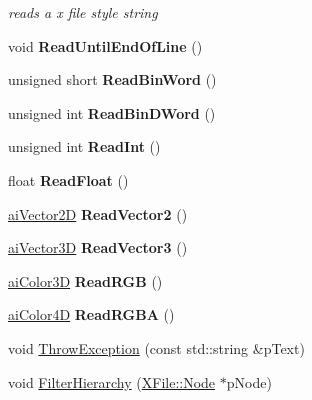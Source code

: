 \begin{DoxyCompactItemize}
\begin{DoxyCompactList}\small\item\em reads a x file style string \end{DoxyCompactList}\item 
\hypertarget{class_assimp_1_1_x_file_parser_aa302b7d6cc5661ee6f9cef70ff01addd}{void {\bfseries Read\+Until\+End\+Of\+Line} ()}\label{class_assimp_1_1_x_file_parser_aa302b7d6cc5661ee6f9cef70ff01addd}

\item 
\hypertarget{class_assimp_1_1_x_file_parser_acdc08c5da9c41871497970ebe6364b52}{unsigned short {\bfseries Read\+Bin\+Word} ()}\label{class_assimp_1_1_x_file_parser_acdc08c5da9c41871497970ebe6364b52}

\item 
\hypertarget{class_assimp_1_1_x_file_parser_a8dffd7bf0a4604d5918030a1547cbdac}{unsigned int {\bfseries Read\+Bin\+D\+Word} ()}\label{class_assimp_1_1_x_file_parser_a8dffd7bf0a4604d5918030a1547cbdac}

\item 
\hypertarget{class_assimp_1_1_x_file_parser_a4f34a5dd7732e0fbd756fdaef444207c}{unsigned int {\bfseries Read\+Int} ()}\label{class_assimp_1_1_x_file_parser_a4f34a5dd7732e0fbd756fdaef444207c}

\item 
\hypertarget{class_assimp_1_1_x_file_parser_a26a4dfebb503f5c5280e5ae93425a501}{float {\bfseries Read\+Float} ()}\label{class_assimp_1_1_x_file_parser_a26a4dfebb503f5c5280e5ae93425a501}

\item 
\hypertarget{class_assimp_1_1_x_file_parser_a76badb4ae83d797e28adabce127f5930}{\hyperlink{structai_vector2_d}{ai\+Vector2\+D} {\bfseries Read\+Vector2} ()}\label{class_assimp_1_1_x_file_parser_a76badb4ae83d797e28adabce127f5930}

\item 
\hypertarget{class_assimp_1_1_x_file_parser_a9971e3d1d52a9a47cf608816a89e5e24}{\hyperlink{structai_vector3_d}{ai\+Vector3\+D} {\bfseries Read\+Vector3} ()}\label{class_assimp_1_1_x_file_parser_a9971e3d1d52a9a47cf608816a89e5e24}

\item 
\hypertarget{class_assimp_1_1_x_file_parser_af2f32c4f0e23e5cb1ad21b61693e6289}{\hyperlink{structai_color3_d}{ai\+Color3\+D} {\bfseries Read\+R\+G\+B} ()}\label{class_assimp_1_1_x_file_parser_af2f32c4f0e23e5cb1ad21b61693e6289}

\item 
\hypertarget{class_assimp_1_1_x_file_parser_af9a2c92313eba42de1a0c9d1efb7d5d3}{\hyperlink{structai_color4_d}{ai\+Color4\+D} {\bfseries Read\+R\+G\+B\+A} ()}\label{class_assimp_1_1_x_file_parser_af9a2c92313eba42de1a0c9d1efb7d5d3}

\item 
void \hyperlink{class_assimp_1_1_x_file_parser_abf8b740b46a44be3d724a57967d968b8}{Throw\+Exception} (const std\+::string \&p\+Text)
\item 
void \hyperlink{class_assimp_1_1_x_file_parser_a3a3c0d40f403a2c02e61aefa8844e189}{Filter\+Hierarchy} (\hyperlink{struct_assimp_1_1_x_file_1_1_node}{X\+File\+::\+Node} $\ast$p\+Node)
\end{DoxyCompactItemize}
